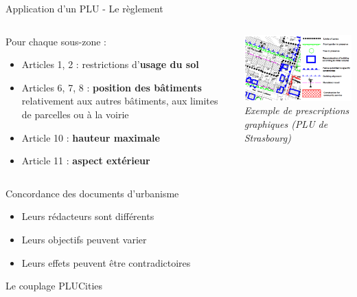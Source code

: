 \documentclass[xcolor=table]{beamer}
\newcommand\FontPetit{\fontsize{8}{6}\selectfont}
\begin{document}
\begin{frame}{Application d'un PLU - Le règlement}
	\begin{columns}[T]
		\begin{column}[T]{5cm}
			Pour chaque sous-zone : 
			\begin{itemize}
				\item Articles 1, 2 : restrictions d’\textbf{usage du sol}
				\item Articles 6, 7, 8 : \textbf{position des bâtiments} relativement aux autres bâtiments, aux limites de parcelles ou à la voirie
				\item Article 10 : \textbf{hauteur maximale}
				\item Article 11 : \textbf{aspect extérieur}
			\end{itemize}
		\end{column}
		\begin{column}[T]{5.5cm}
			\centering
			\includegraphics[width=6cm]{Images/codesplu.png}
			\\
			\textit{Exemple de prescriptions graphiques (PLU de Strasbourg)}
		\end{column}
	\end{columns}
\end{frame}

\begin{frame}{Concordance des documents d'urbanisme}
	\begin{itemize}
		\item Leurs rédacteurs sont différents
		\item Leurs objectifs peuvent varier
		\item Leurs effets peuvent être contradictoires
	\end{itemize}
\end{frame}

\begin{frame}{Le couplage PLUCities}
	\FontPetit{}
\end{frame}
\end{document}
